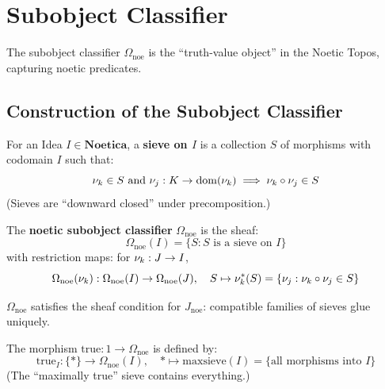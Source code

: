 \section{Subobject Classifier}
\label{sec:subobject-classifier}

The subobject classifier $\Omega_{\mathrm{noe}}$ is the ``truth-value object''
in the Noetic Topos, capturing noetic predicates.

\subsection{Construction of the Subobject Classifier}
\label{subsec:subobject-classifier-construction}

\begin{definition}
\label{def:sieves-truth}
For an Idea $I \in \mathbf{Noetica}$, a \textbf{sieve on $I$} is a collection
$S$ of morphisms with codomain $I$ such that:
\[
  \nu_{k} \in S \text{ and } \nu_{j} : K \to \mathrm{dom}(\nu_{k})
  \implies \nu_{k} \circ \nu_{j} \in S
\]
(Sieves are ``downward closed'' under precomposition.)
\end{definition}

\begin{definition}
\label{def:noetic-omega}
The \textbf{noetic subobject classifier} $\Omega_{\mathrm{noe}}$ is the sheaf:
\[
  \Omega_{\mathrm{noe}}(I) = \{S : S \text{ is a sieve on } I\}
\]
with restriction maps: for $\nu_{k} : J \to I$,
\[
  \Omega_{\mathrm{noe}}(\nu_{k}) : \Omega_{\mathrm{noe}}(I) \to \Omega_{\mathrm{noe}}(J), \quad
  S \mapsto \nu_{k}^*(S) = \{\nu_{j} : \nu_{k} \circ \nu_{j} \in S\}
\]
\end{definition}

\begin{proposition}
\label{prop:omega-is-sheaf}
$\Omega_{\mathrm{noe}}$ satisfies the sheaf condition for $J_{\mathrm{noe}}$:
compatible families of sieves glue uniquely.
\end{proposition}

\begin{definition}
\label{def:true-morphism}
The morphism $\mathrm{true} : 1 \to \Omega_{\mathrm{noe}}$ is defined by:
\[
  \mathrm{true}_I : \{*\} \to \Omega_{\mathrm{noe}}(I), \quad
  * \mapsto \mathrm{maxsieve}(I) = \{\text{all morphisms into } I\}
\]
(The ``maximally true'' sieve contains everything.)
\end{definition}

